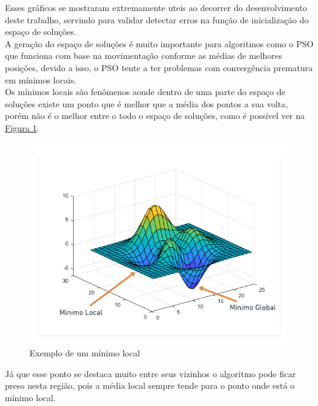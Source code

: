 Esses gráficos se mostraram extremamente uteis ao decorrer do desenvolvimento deste trabalho, servindo para validar detectar erros na função de inicialização do espaço de soluções.\\
\indent A geração do espaço de soluções é muito importante para algoritmos como o PSO 
que funciona com base na movimentação conforme as médias de melhores posições, 
devido a isso, o PSO tente a ter problemas com convergência prematura em mínimos locais.\\
\indent Os mínimos locais são fenômenos aonde dentro de uma parte do espaço de soluções existe um ponto que é melhor que a média dos pontos a sua volta, porém não é o melhor entre o todo o espaço de soluções, como é possível ver na \hyperref[fig:ex-minimolocal]{Figura \ref{fig:ex-minimolocal}}.\newline
\begin{figure}[ht]
    \centering
    \caption{Exemplo de um mínimo local}
    \label{fig:ex-minimolocal}
    \includegraphics[width=\textwidth]{assets/minimo_local.png}
\end{figure}
Já que esse ponto se destaca muito entre seus vizinhos o algoritmo pode ficar preso nesta região, pois a média local sempre tende para o ponto onde está o mínimo local.\\
